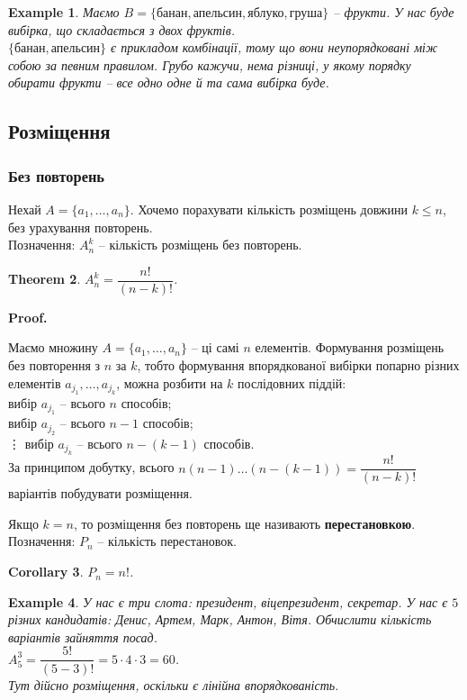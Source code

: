 \documentclass[a4paper, 14pt]{extarticle}
\makeatletter
\theoremstyle{theoremdd}
\newtheorem{theorem}{Theorem}[subsection]
\theoremstyle{theoremdd}
\theoremstyle{theoremdd}
\theoremstyle{theoremdd}
\theoremstyle{theoremdd}
\newtheorem{example}[theorem]{Example}
\theoremstyle{theoremdd}
\theoremstyle{theoremdd}
\theoremstyle{theoremdd}
\theoremstyle{theoremdd}
\theoremstyle{theoremdd}
\theoremstyle{theoremdd}
\theoremstyle{theoremdd}
\theoremstyle{theoremdd}
\theoremstyle{theoremdd}
\newtheorem{corollary}[theorem]{Corollary}
\theoremstyle{theoremdd}
\renewenvironment{proof}[1][Proof.\\]{\par
\pushQED{\hfill \qed}%
\normalfont \topsep6\p@\@plus6\p@\relax
\trivlist
\item\relax
{\bfseries
#1\@addpunct{.}}\hspace\labelsep\ignorespaces
}{%
\popQED\endtrivlist\@endpefalse
}
\makeatother
\begin{document}
\begin{example}
Маємо $B = \{\text{банан},\text{апельсин},\text{яблуко},\text{груша}\}$ -- фрукти. У нас буде вибірка, що складається з двох фруктів.\\
$\{ \text{банан}, \text{апельсин} \}$ є прикладом комбінації, тому що вони неупорядковані між собою за певним правилом. Грубо кажучи, нема різниці, у якому порядку обирати фрукти -- все одно одне й та сама вибірка буде.
\end{example}

\subsection{Розміщення}
\subsubsection*{Без повторень}
Нехай $A = \{a_1,\dots,a_n\}$. Хочемо порахувати кількість розміщень довжини $k \leq n$, без урахування повторень.\\
Позначення: $A_n^k$ -- кількість розміщень без повторень.

\begin{theorem}
$A_n^k = \dfrac{n!}{(n-k)!}$.
\end{theorem}

\begin{proof}
Маємо множину $A = \{a_1,\dots,a_n\}$ -- ці самі $n$ елементів. Формування розміщень без повторення з $n$ за $k$, тобто формування впорядкованої вибірки попарно різних елементів $a_{j_1},\dots,a_{j_k}$, можна розбити на $k$ послідовних піддій: \\
вибір $a_{j_1}$ -- всього $n$ способів;\\
вибір $a_{j_2}$ -- всього $n-1$ способів;\\
\vdots
вибір $a_{j_k}$ -- всього $n-(k-1)$ способів.\\
За принципом добутку, всього $n (n-1) \dots (n-(k-1)) = \dfrac{n!}{(n-k)!}$ варіантів побудувати розміщення.
\end{proof}

Якщо $k = n$, то розміщення без повторень ще називають \textbf{перестановкою}. \\
Позначення: $P_n$ -- кількість перестановок.

\begin{corollary}
$P_n = n!$.
\end{corollary}

\begin{example}
У нас є три слота: президент, віцепрезидент, секретар. У нас є $5$ різних кандидатів: Денис, Артем, Марк, Антон, Вітя. Обчислити кількість варіантів зайняття посад.\\
$A_5^3 = \dfrac{5!}{(5-3)!} = 5 \cdot 4 \cdot 3 = 60$.
\bigskip \\
Тут дійсно розміщення, оскільки є лінійна впорядкованість.
\end{example}
\end{document}

